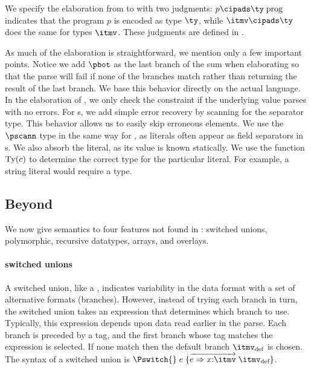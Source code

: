 We specify the elaboration from \ipads{} to \ddc{} with two judgments:
 $p \cipads \ty\; \text{prog}$ indicates that the \ipads{} program
$p$ is encoded as \ddc{} type $\ty$, while $\itmv \cipads \ty$
does the same for \ipads{} types $\itmv$. These judgments are defined
in .

As much of the elaboration is straightforward, we mention only a few
important points. Notice we add $\pbot$ as the
last branch of the \ddc{} sum when elaborating \Punion{} so that the
parse will fail if none of the branches match rather than returning
the result of the last branch. We base this behavior
  directly on the actual \padsc{} language. In the elaboration of
\Pwhere{}, we only check the constraint if the underlying value parses
with no errors. For \Parray{}s, we add simple error recovery by
scanning for the separator type.  This behavior allows us to easily
skip erroneous elements. We use the $\pscann$ type in the same way for
, as literals often appear as field separators in
\Pstruct{}s.  We also absorb the literal, as its value is known
statically.  We use the function ${\rm Ty}(c)$ to determine the
correct type for the particular literal. For example, a string
literal would require a \Pstring{} type.

\subsection{Beyond \ipads{}}

We now give semantics to four features not found in \ipads{}: \padsc{}
switched unions, \padsml{} polymorphic, recursive datatypes,
\datascript{} arrays, and \packettypes{} overlays.

\paragraph*{\padsc{} switched unions}
A switched union, like a \Punion, indicates variability in the data
format with a set of alternative formats (branches). However, instead
of trying each branch in turn, the switched union takes an expression that
determines which branch to use. Typically, this expression depends upon data read earlier in the parse. Each branch is preceded by a tag,
and the first branch whose tag matches the expression is selected.
If none match then the default branch $\itmv_{\text{def}}$ is chosen.
The syntax of a switched union is $\Pswitch{}\;e\;\{\overrightarrow{e
  \Rightarrow x{:}\itmv}\; \itmv_{\text{def}}\}$.

